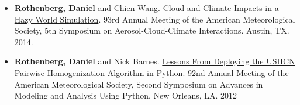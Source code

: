 \documentclass[11pt,letterpaper]{article}
\begin{document}
\begin{itemize}[itemindent=-10pt]
 \item \textbf{Rothenberg, Daniel} and Chien Wang. \href{http://figshare.com/articles/AMS_2014_Evaluating_the_Role_of_Aerosol_Mixing_State_in_Cloud_Droplet_Nucleation_towards_Developing_a_New_Activation_Parameterization/918655}{Cloud and Climate Impacts in a Hazy World Simulation}. 93rd Annual Meeting of the American Meteorological Society, 5th Symposium on Aerosol-Cloud-Climate Interactions. Austin, TX. 2014.

 \item \textbf{Rothenberg, Daniel} and Nick Barnes. \href{https://ams.confex.com/ams/92Annual/webprogram/Paper198219.html}{Lessons From Deploying the USHCN Pairwise Homogenization Algorithm in Python}. 92nd Annual Meeting of the American Meteorological Society, Second Symposium on Advances in Modeling and Analysis Using Python. New Orleans, LA. 2012
\end{itemize}
\end{document}
